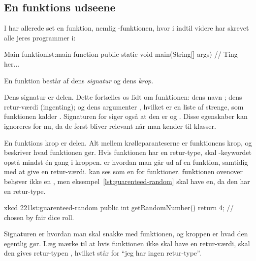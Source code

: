 
	\subsection{En funktions udseene}

		I har allerede set en funktion, nemlig -funktionen, hvor i
		indtil videre har skrevet alle jeres programmer i:

		\begin{JavaCode}{Main funktion}{lst:main-function}
			public static void main(String[] args) {
				// Ting her...
			}
		\end{JavaCode}

		En funktion består af dens \emph{signatur} og dens \emph{krop}.

        Dens signatur er 
        delen.  Dette fortælles os lidt om funktionen: dens
        navn ; dens retur-værdi  (ingenting); og
        dens argumenter , hvilket er en liste af
        strenge, som funktionen kalder .  Signaturen for
         siger også at den er  og
        . Disse egenskaber kan ignoreres for nu, da de
        først bliver relevant når man kender til klasser.

        En funktions krop er  delen. Alt
        mellem krølleparanteserne er funktionens krop, og beskriver
        hvad funktionen gør.  Hvis funktionen har en retur-type, skal
        -keywordet opstå mindst én gang i kroppen.
         er hvordan man går ud af en funktion,
        samtidig med at give en retur-værdi.   kan
        ses som en  for funktioner.
         funktionen ovenover behøver ikke en
        , men eksempel~\ref{lst:guarenteed-random}
        skal have en, da den har en retur-type.

		\begin{JavaCode}{xkcd 221}{lst:guarenteed-random}
			public int getRandomNumber() {
				return 4;  // chosen by fair dice roll.
			}
		\end{JavaCode}

        Signaturen er hvordan man skal snakke med funktionen, og
        kroppen er hvad den egentlig gør. Læg mærke til at hvis
        funktionen ikke skal have en retur-værdi, skal den gives
        retur-typen , hvilket står for ``jeg har ingen retur-type''.

